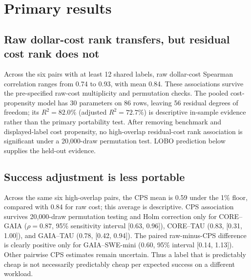 \documentclass[11pt]{article}
\begin{document}
\section{Primary results}
\label{sec:primary-results}

\subsection{Raw dollar-cost rank transfers, but residual cost rank does not}

Across the six pairs with at least 12 shared labels, raw dollar-cost Spearman correlation ranges from 0.74 to 0.93, with mean 0.84. These associations survive the pre-specified raw-cost multiplicity and permutation checks. The pooled cost-propensity model has 30 parameters on 86 rows, leaving 56 residual degrees of freedom; its \(R^2=82.0\%\) (adjusted \(R^2=72.7\%\)) is descriptive in-sample evidence rather than the primary portability test. After removing benchmark and displayed-label cost propensity, no high-overlap residual-cost rank association is significant under a 20,000-draw permutation test. LOBO prediction below supplies the held-out evidence.

\begin{table}[t]
\centering\small
\caption{High-overlap raw dollar-cost rank transfer and residual cost-rank sensitivity. Residual ranks remove observed displayed-label and benchmark log-cost effects; they are not list-price-adjusted costs.}

\end{table}

\subsection{Success adjustment is less portable}

Across the same six high-overlap pairs, the CPS mean is 0.59 under the 1\% floor, compared with 0.84 for raw cost; this average is descriptive. CPS association survives 20,000-draw permutation testing and Holm correction only for CORE--GAIA (\(\rho=0.87\), 95\% sensitivity interval [0.63, 0.96]), CORE--TAU (0.83, [0.31, 1.00]), and GAIA--TAU (0.78, [0.42, 0.94]). The paired raw-minus-CPS difference is clearly positive only for GAIA--SWE-mini (0.60, 95\% interval [0.14, 1.13]). Other pairwise CPS estimates remain uncertain. Thus a label that is predictably cheap is not necessarily predictably cheap per expected success on a different workload.
\end{document}
